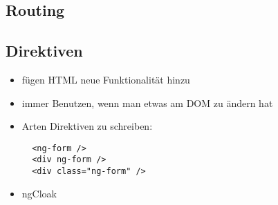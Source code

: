 \subsection{Routing}

\subsection{Direktiven}
\begin{itemize}
  \item fügen HTML neue Funktionalität hinzu
  \item immer Benutzen, wenn man etwas am DOM zu ändern hat
  \item Arten Direktiven zu schreiben:
    \begin{verbatim}
  <ng-form />
  <div ng-form />
  <div class="ng-form" />
    \end{verbatim}
  \item ngCloak
\end{itemize}



